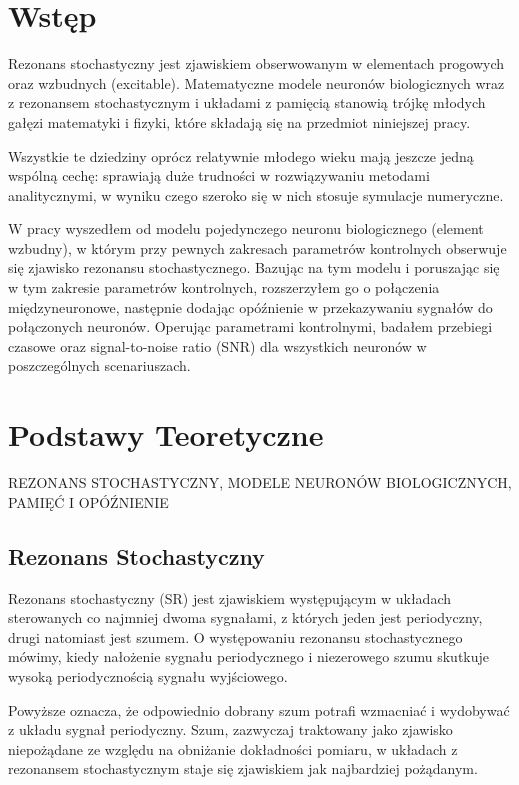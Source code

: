 \documentclass[12pt]{article}
\begin{document}
  \section{Wstęp}
  Rezonans stochastyczny jest zjawiskiem obserwowanym w elementach progowych oraz wzbudnych (excitable). Matematyczne modele neuronów biologicznych wraz z rezonansem stochastycznym i układami z pamięcią stanowią trójkę młodych gałęzi matematyki i fizyki, które składają się na przedmiot niniejszej pracy.
  
  Wszystkie te dziedziny oprócz relatywnie młodego wieku mają jeszcze jedną wspólną cechę: sprawiają duże trudności w rozwiązywaniu metodami analitycznymi, w wyniku czego szeroko się w nich stosuje symulacje numeryczne.
  
  W pracy wyszedłem od modelu pojedynczego neuronu biologicznego (element wzbudny), w którym przy pewnych zakresach parametrów kontrolnych obserwuje się zjawisko rezonansu stochastycznego. Bazując na tym modelu i poruszając się w tym zakresie parametrów kontrolnych, rozszerzyłem go o połączenia międzyneuronowe, następnie dodając opóźnienie w przekazywaniu sygnałów do połączonych neuronów. Operując parametrami kontrolnymi, badałem przebiegi czasowe oraz signal-to-noise ratio (SNR) dla wszystkich neuronów w poszczególnych scenariuszach. 
  
  
  \section{Podstawy Teoretyczne}
  
  REZONANS STOCHASTYCZNY, MODELE NEURONÓW BIOLOGICZNYCH, PAMIĘĆ I OPÓŹNIENIE
  
  
  \subsection{Rezonans Stochastyczny}
  
  Rezonans stochastyczny (SR) jest zjawiskiem występującym w układach sterowanych co najmniej dwoma sygnałami, z których jeden jest periodyczny, drugi natomiast jest szumem. O występowaniu rezonansu stochastycznego mówimy, kiedy nałożenie sygnału periodycznego i niezerowego szumu skutkuje wysoką periodycznością sygnału wyjściowego.
  
  Powyższe oznacza, że odpowiednio dobrany szum potrafi wzmacniać i wydobywać z układu sygnał periodyczny. Szum, zazwyczaj traktowany jako zjawisko niepożądane ze względu na obniżanie dokładności pomiaru, w układach z rezonansem stochastycznym staje się zjawiskiem jak najbardziej pożądanym. 
  
\end{document}
